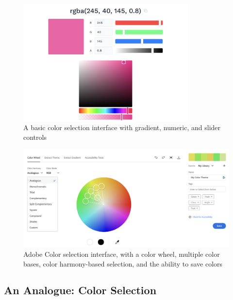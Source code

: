 \begin{figure}[p]
    \centering
    \includegraphics[width=0.8\textwidth]{images/basic-color-picker.png}
    \caption{A basic color selection interface with gradient, numeric, and slider controls}
    \label{fig:basic-color-picker}
\end{figure}

\begin{figure}[p]
    \centering
    \includegraphics[width=\textwidth]{images/adobe-color.png}
    \caption{Adobe Color selection interface, with a color wheel, multiple color bases, color harmony-based selection, and the ability to save colors}
    \label{fig:adobe-color}
\end{figure}

\subsection{An Analogue: Color Selection}

